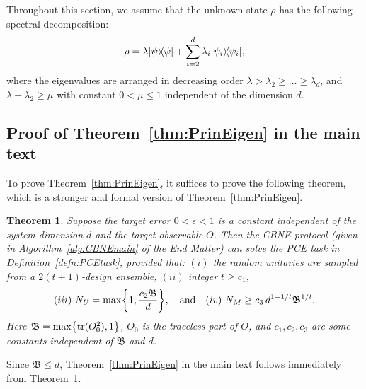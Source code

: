 \documentclass[aps,prl,twocolumn,nofootinbib,superscriptaddress,10pt]{revtex4-2}
\let\originalleft\left
\let\originalright\right
\renewcommand{\left}{\mathopen{}\mathclose\bgroup\originalleft}
\renewcommand{\right}{\aftergroup\egroup\originalright}
\newcommand{\ketbra}[2]{\ensuremath{\left|#1\right\rangle\!\left\langle#2\right|}}
\DeclareMathOperator{\Tr}{tr}
\theoremstyle{plain}
\newtheorem{theorem}[thm]{Theorem}
\theoremstyle{definition}
\newcommand{\tref}[1]{Theorem~\ref{#1}}
\begin{document}
Throughout this section, we assume that the unknown state $\rho$ has the following spectral decomposition:
\begin{align}\label{eq:rhospec1}
	\rho=\lambda \ketbra{\psi}{\psi} + \sum_{i=2}^d \lambda_i \ketbra{\psi_i}{\psi_i},
\end{align}
where the eigenvalues are arranged in decreasing order $\lambda> \lambda_2\geq \dots \geq \lambda_d$, 
and $\lambda-\lambda_2\geq \mu$ with constant $0<\mu\leq1$ independent of the dimension $d$.


\subsection{Proof of \tref{thm:PrinEigen} in the main text}

To prove \tref{thm:PrinEigen}, it suffices to prove the following theorem, which is a stronger and formal version of \tref{thm:PrinEigen}.  


\begin{theorem}\label{thm:PrinEigenFor}%
	Suppose the target error $0<\epsilon<1$ is a constant independent of the system dimension $d$ and the target observable $O$. 
	Then the CBNE protocol (given in  Algorithm~\ref{alg:CBNEmain} of the End Matter) can solve the PCE task in Definition~\ref{defn:PCEtask},
	provided that: $(i)$ the random unitaries are sampled from a $2(t+1)$-design ensemble, $(ii)$ integer $t\geq c_1$, 
	\begin{align}\label{eq:PCEtaskNuNm}
		(iii)\ N_U = \max\left\lbrace 1, \dfrac{c_2 \mathfrak{B}}{d} \right\rbrace, 
		\quad \text{and} \quad
		(iv)\ N_M \geq  c_3 \,d^{1-1/t}\mathfrak{B}^{1/t} .  
	\end{align}
    Here $\mathfrak{B}= \max \left\lbrace \Tr(O_0^2),1\right\rbrace$, $O_0$ is the traceless part of $O$, and $c_1,c_2,c_3$ are some constants independent of $\mathfrak{B}$ and $d$.
\end{theorem}

Since $\mathfrak{B}\leq d$,
\tref{thm:PrinEigen} in the main text follows immediately from \tref{thm:PrinEigenFor}. 
\end{document}
